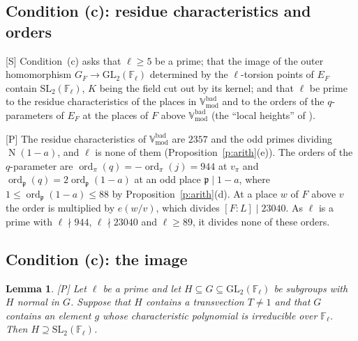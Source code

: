 \documentclass[11pt,a4paper]{article}
\newcommand{\F}{\mathbb{F}}
\newcommand{\Vbadmod}{\mathbb{V}^{\mathrm{bad}}_{\mathrm{mod}}}
\newcommand{\ord}{\operatorname{ord}}
\newcommand{\Nm}{\operatorname{N}}
\newcommand{\GL}{\mathrm{GL}}
\newcommand{\SL}{\mathrm{SL}}
\newcommand{\tS}{\textup{[S]}}
\newcommand{\tP}{\textup{[P]}}
\theoremstyle{plain}
\newtheorem{lemma}[theorem]{Lemma}
\theoremstyle{definition}
\begin{document}
\subsection{Condition (c): residue characteristics and orders}\label{ss:orders}

\tS{} Condition~(c) asks that $\ell\ge5$ be a prime; that the image of the outer homomorphism $G_F\to\GL_2(\F_\ell)$
determined by the $\ell$-torsion points of $E_F$ contain $\SL_2(\F_\ell)$, $K$ being the field cut out by its kernel;
and that $\ell$ be prime to the residue characteristics of the places in $\Vbadmod$ and to the orders of the
$q$-parameters of $E_F$ at the places of $F$ above $\Vbadmod$ (the ``local heights'' of \cite[Def.~3.3]{GenEll}).

\tP{} The residue characteristics of $\Vbadmod$ are $2357$ and the odd primes dividing $\Nm(1-a)$, and $\ell$ is none of
them (Proposition~\ref{p:arith}(e)). The orders of the $q$-parameter are $\ord_\pi(q)=-\ord_\pi(j)=944$ at $v_\pi$ and
$\ord_{\mathfrak p}(q)=2\ord_{\mathfrak p}(1-a)$ at an odd place $\mathfrak p\mid1-a$, where
$1\le\ord_{\mathfrak p}(1-a)\le88$ by Proposition~\ref{p:arith}(d). At a place $w$ of $F$ above $v$ the order is
multiplied by $e(w/v)$, which divides $[F:L]\mid23040$. As $\ell$ is a prime with $\ell\nmid944$, $\ell\nmid23040$ and
$\ell\ge89$, it divides none of these orders.

\subsection{Condition (c): the image}\label{ss:image}

\begin{lemma}\label{l:transvection}
\tP{} Let $\ell$ be a prime and let $H\subseteq G\subseteq\GL_2(\F_\ell)$ be subgroups with $H$ normal in $G$. Suppose
that $H$ contains a transvection $T\ne1$ and that $G$ contains an element $g$ whose characteristic polynomial is
irreducible over $\F_\ell$. Then $H\supseteq\SL_2(\F_\ell)$.
\end{lemma}
\end{document}
